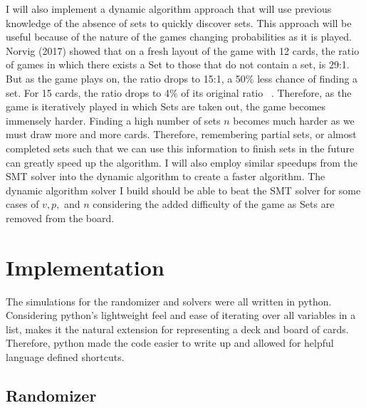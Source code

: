 \documentclass[pageno]{jpaper}
\begin{document}
I will also implement a dynamic algorithm approach that will use previous knowledge of the absence of sets to quickly discover sets. This approach will be useful because of the nature of the games changing probabilities as it is played. Norvig (2017) showed that on a fresh layout of the game with 12 cards, the ratio of games in which there exists a Set to those that do not contain a set, is 29:1. But as the game plays on, the ratio drops to 15:1, a 50\% less chance of finding a set. For 15 cards, the ratio drops to 4\% of its original ratio ~\cite{norvig}. Therefore, as the game is iteratively played in which Sets are taken out, the game becomes immensely harder. Finding a high number of sets $n$ becomes much harder as we must draw more and more cards. Therefore, remembering partial sets, or almost completed sets such that we can use this information to finish sets in the future can greatly speed up the algorithm. I will also employ similar speedups from the SMT solver into the dynamic algorithm to create a faster algorithm. The dynamic algorithm solver I build should be able to beat the SMT solver for some cases of $v,p,$ and $n$ considering the added difficulty of the game as Sets are removed from the board. 

\section{Implementation}

The simulations for the randomizer and solvers were all written in python. Considering python's lightweight feel and ease of iterating over all variables in a list, makes it the natural extension for representing a deck and board of cards. Therefore, python made the code easier to write up and allowed for helpful language defined shortcuts. 


\subsection{Randomizer}
\end{document}
